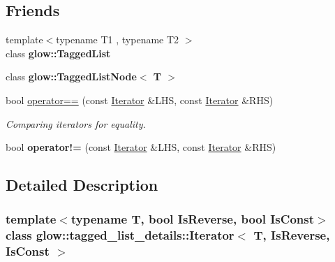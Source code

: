 \subsection*{Friends}
\begin{DoxyCompactItemize}
\item 
\mbox{\label{classglow_1_1tagged__list__details_1_1_iterator_a9a56653266ecaea749ca94516a403d9a}} 
{\footnotesize template$<$typename T1 , typename T2 $>$ }\\class {\bfseries glow\+::\+Tagged\+List}
\item 
\mbox{\label{classglow_1_1tagged__list__details_1_1_iterator_a34a3c470ca8b99fa9ef4deeffd6bb857}} 
class {\bfseries glow\+::\+Tagged\+List\+Node$<$ T $>$}
\item 
\mbox{\label{classglow_1_1tagged__list__details_1_1_iterator_a287ad3a6bd1f713d9aa5440f8f04eb27}} 
bool \hyperlink{classglow_1_1tagged__list__details_1_1_iterator_a287ad3a6bd1f713d9aa5440f8f04eb27}{operator==} (const \hyperlink{classglow_1_1tagged__list__details_1_1_iterator}{Iterator} \&L\+HS, const \hyperlink{classglow_1_1tagged__list__details_1_1_iterator}{Iterator} \&R\+HS)
\begin{DoxyCompactList}\small\item\em Comparing iterators for equality. \end{DoxyCompactList}\item 
\mbox{\label{classglow_1_1tagged__list__details_1_1_iterator_ae9bcaf0b683f96c35d4f1656e4200325}} 
bool {\bfseries operator!=} (const \hyperlink{classglow_1_1tagged__list__details_1_1_iterator}{Iterator} \&L\+HS, const \hyperlink{classglow_1_1tagged__list__details_1_1_iterator}{Iterator} \&R\+HS)
\end{DoxyCompactItemize}


\subsection{Detailed Description}
\subsubsection*{template$<$typename T, bool Is\+Reverse, bool Is\+Const$>$\newline
class glow\+::tagged\+\_\+list\+\_\+details\+::\+Iterator$<$ T, Is\+Reverse, Is\+Const $>$}


